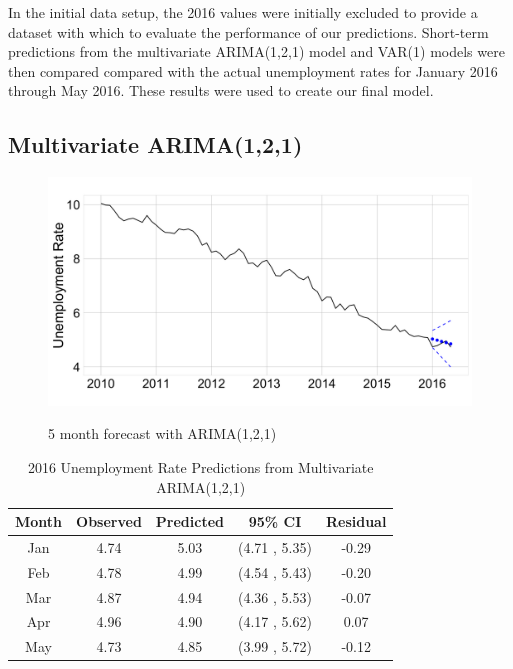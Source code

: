 \documentclass[twoside,twocolumn]{article}
\begin{document}
In the initial data setup, the 2016 values were initially excluded to provide a dataset with which to evaluate the performance of our predictions. Short-term predictions from the multivariate ARIMA(1,2,1) model and VAR(1) models were then compared compared with the actual unemployment rates for January 2016 through May 2016. These results were used to create our final model.

\subsection{Multivariate ARIMA(1,2,1)}

   \begin{figure}[htb]
    	\centering
     	\caption{5 month forecast with ARIMA(1,2,1)}
     	\includegraphics[width=\linewidth]{images/ARIMApred}
     	\label{fig:arimapred}
 \end{figure}

\begin{table}[ht]
\centering
\caption{2016 Unemployment Rate Predictions from Multivariate ARIMA(1,2,1)}
\label{tab:arimaforecast}
\begin{tabular}{ccccc}
  \hline
 Month & Observed & Predicted& 95\% CI  & Residual \\ 
  \hline
Jan & 4.74 & 5.03 & (4.71 , 5.35) & -0.29 \\ 
Feb & 4.78 & 4.99 & (4.54 , 5.43) & -0.20 \\ 
Mar & 4.87 & 4.94 & (4.36 , 5.53) & -0.07 \\ 
Apr & 4.96 & 4.90 & (4.17 , 5.62) & 0.07 \\ 
May & 4.73 & 4.85 & (3.99 , 5.72) & -0.12 \\ 
   \hline
\end{tabular}
\end{table}
\end{document}
